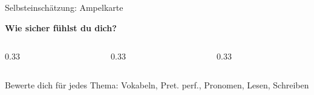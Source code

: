\documentclass[aspectratio=169, 11pt]{beamer}
\begin{document}
\begin{frame}{Selbsteinschätzung: Ampelkarte}
    \begin{center}
        \textbf{Wie sicher fühlst du dich?}
    \end{center}

    \vspace{10pt}

    \begin{columns}
        \begin{column}{0.33\textwidth}
            \begin{center}
            \end{center}
        \end{column}
        \begin{column}{0.33\textwidth}
            \begin{center}
            \end{center}
        \end{column}
        \begin{column}{0.33\textwidth}
            \begin{center}
            \end{center}
        \end{column}
    \end{columns}

    \vspace{15pt}

    \begin{center}
        {\small Bewerte dich für jedes Thema: Vokabeln, Pret. perf., Pronomen, Lesen, Schreiben}
    \end{center}
\end{frame}
\end{document}
